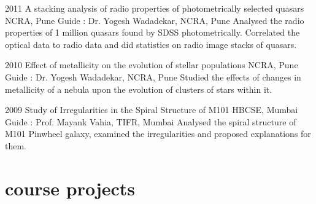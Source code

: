 \documentclass[11pt]{friggeri-cv}%
\begin{document}
    \begin{entrylist}


  \entry
    {2011}
    {A stacking analysis of radio properties of photometrically selected quasars}
    {NCRA, Pune}
    {
    Guide : Dr. Yogesh Wadadekar, NCRA, Pune}
    {Analysed the radio properties of 1 million quasars found by SDSS photometrically. Correlated the optical data to radio data and did statistics on radio image stacks of quasars.
    }
    \end{entrylist}
    \begin{entrylist}
  \entry
    {2010}
    {Effect of metallicity on the evolution of stellar populations}
    {NCRA, Pune}
    {
    Guide : Dr. Yogesh Wadadekar, NCRA, Pune}
    {Studied the effects of changes in metallicity of a nebula upon the evolution of clusters of stars within it.
    }

    \end{entrylist}
\begin{entrylist}
  \entry
    {2009}
    {Study of Irregularities in the Spiral Structure of M101}
    {HBCSE, Mumbai}
    {
    Guide : Prof. Mayank Vahia, TIFR, Mumbai}
    {Analysed the spiral structure of M101 Pinwheel galaxy, examined the irregularities  and proposed explanations for them. 
    }    
\end{entrylist}

\section{course projects}
\end{document}
